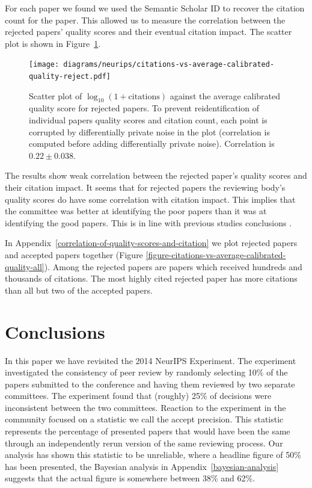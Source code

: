 \documentclass[twoside]{article}
\begin{document}
For each paper we found we used the Semantic Scholar ID to recover the
citation count for the paper. This allowed us to measure the
correlation between the rejected papers' quality scores and their
eventual citation impact. The scatter plot is shown in Figure~\ref{figure-citations-vs-average-calibrated-quality-reject}.

\begin{figure}[htb]
\begin{center}
\texttt{[image: diagrams/neurips/citations-vs-average-calibrated-quality-reject.pdf]}
\end{center}
\caption{Scatter plot of $\log_{10}(1+\text{citations})$ against the
  average calibrated quality score for rejected papers. To prevent
  reidentification of individual papers quality scores and citation
  count, each point is corrupted by differentially private noise in
  the plot (correlation is computed before adding differentially
  private noise). Correlation is $0.22 \pm 0.038$. }
\label{figure-citations-vs-average-calibrated-quality-reject}
\end{figure}

The results show weak correlation between the rejected paper's quality
scores and their citation impact. It seems that for rejected papers the reviewing body's quality scores do have some correlation with citation impact. This implies that the committee was better at identifying the poor papers than it was at identifying the good papers. This is in line with previous studies conclusions \citep{Hargens-assessments90}.

In Appendix~\ref{correlation-of-quality-scores-and-citation} we plot rejected papers and accepted papers together (Figure \ref{figure-citations-vs-average-calibrated-quality-all}). Among the rejected papers are papers which received hundreds and thousands of citations. The most highly cited rejected paper has more citations than all but two of the accepted papers. 

\section{Conclusions}

In this paper we have revisited the 2014 NeurIPS Experiment. The
experiment investigated the consistency of peer review by randomly
selecting 10\% of the papers submitted to the conference and having
them reviewed by two separate committees. The experiment found that
(roughly) 25\% of decisions were inconsistent between the two
committees. Reaction to the experiment in the community focused on a
statistic we call the accept precision. This statistic represents the
percentage of presented papers that would have been the same through
an independently rerun version of the same reviewing process. Our analysis has shown this statistic to be
unreliable, where a headline figure of 50\% has been presented, the  Bayesian analysis in Appendix~\ref{bayesian-analysis} suggests that the actual figure is somewhere between 38\% and 62\%.
\end{document}
